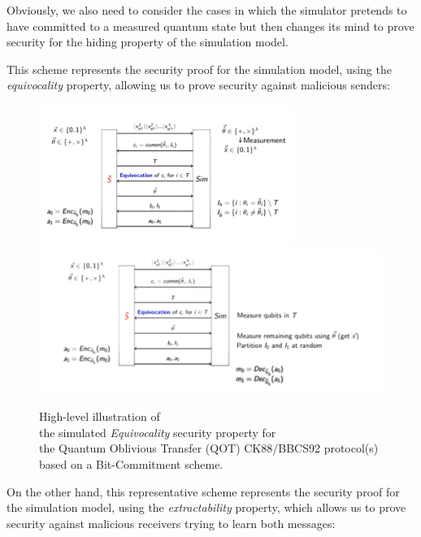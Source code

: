 \documentclass[12pt]{article}
\begin{document}
    \noindent Obviously, we also need to consider the cases in which the simulator pretends to have committed to a measured quantum state but then changes its mind to prove security for the hiding property of the simulation model.
    
    \noindent This scheme represents the security proof for the simulation model, using the \textit{equivocality} property, allowing us to prove security against malicious senders:

   \begin{figure}[ht]
        \captionsetup{justification=centering}
        \centering
        \includegraphics[width=0.74\textwidth]{figures/images/img-12.pdf}\phantom{...................}\\
        \includegraphics[width=\textwidth]{figures/images/img-13.pdf}
        \caption{High-level illustration of\\ the simulated \textit{Equivocality} security property for\\ the Quantum Oblivious Transfer (QOT) CK88/BBCS92 protocol(s)\\ based on a Bit-Commitment scheme.}
        \label{fig:simulated-equivocality-security-property-quantum-oblivious-transfer-ck88-bbcs92-protocols-based-bit-commitment-scheme}
    \end{figure}

    \clearpage
    
    \noindent On the other hand, this representative scheme represents the security proof for the simulation model, using the \textit{extractability} property, which allows us to prove security against malicious receivers trying to learn both messages:
\end{document}
